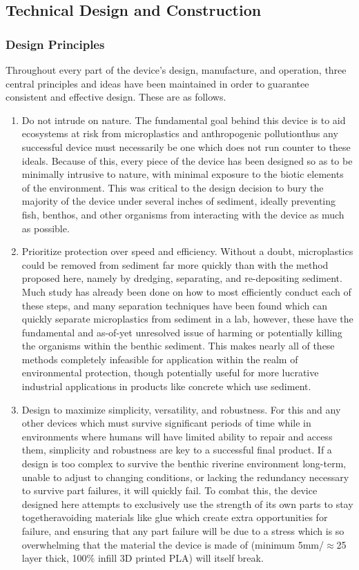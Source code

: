 \documentclass[fleqn,10pt]{SelfArx} %
\begin{document}
	\subsection{Technical Design and Construction}
	\label{subsec:TechDesign}
	\subsubsection{Design Principles}
	
	Throughout every part of the device’s design, manufacture, and operation, three central principles and ideas have been maintained in order to guarantee consistent and effective design. These are as follows.
	\begin{enumerate}
		\item Do not intrude on nature.
		\subitem The fundamental goal behind this device is to aid ecosystems at risk from microplastics and anthropogenic pollution\textemdash thus any successful device must necessarily be one which does not run counter to these ideals. Because of this, every piece of the device has been designed so as to be minimally intrusive to nature, with minimal exposure to the biotic elements of the environment. This was critical to the design decision to bury the majority of the device under several inches of sediment, ideally preventing fish, benthos, and other organisms from interacting with the device as much as possible.
		\item Prioritize protection over speed and efficiency.
		\subitem Without a doubt, microplastics could be removed from sediment far more quickly than with the method proposed here, namely by dredging, separating, and re-depositing sediment. Much study has already been done on how to most efficiently conduct each of these steps, and many separation techniques have been found which can quickly separate microplastics from sediment in a lab, however, these have the fundamental and as-of-yet unresolved issue of harming or potentially killing the organisms within the benthic sediment. This makes nearly all of these methods completely infeasible for application within the realm of environmental protection, though potentially useful for more lucrative industrial applications in products like concrete which use sediment. 
		\item Design to maximize simplicity, versatility, and robustness.
		\subitem For this and any other devices which must survive significant periods of time while in environments where humans will have limited ability to repair and access them, simplicity and robustness are key to a successful final product. If a design is too complex to survive the benthic riverine environment long-term, unable to adjust to changing conditions, or lacking the redundancy necessary to survive part failures, it will quickly fail. To combat this, the device designed here attempts to exclusively use the strength of its own parts to stay together\textemdash avoiding materials like glue which create extra opportunities for failure, and ensuring that any part failure will be due to a stress which is so overwhelming that the material the device is made of (minimum 5mm/$\approx$25 layer thick, 100\% infill 3D printed PLA) will itself break. 
		

\end{enumerate}
\end{document}
